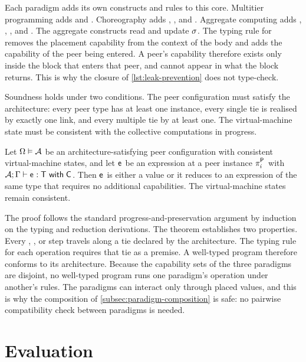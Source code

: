 Each paradigm adds its own constructs and rules to this core.
Multitier programming adds  and .
Choreography adds , , and .
Aggregate computing adds , , , and .
%
The aggregate constructs read and update $\vmstate$.
%
The typing rule for  removes the placement capability from the context of the body and adds the capability of the peer being entered.
%
A peer's capability therefore exists only inside the block that enters that peer,
and cannot appear in what the block returns.
%
This is why the closure of \cref{lst:leak-prevention} does not type-check.

Soundness holds under two conditions.
%
The peer configuration must satisfy the architecture:
every peer type has at least one instance, every single tie is realised by exactly one link, and every multiple tie by at least one.
%
The virtual-machine state must be consistent with the collective computations in progress.

\begin{theorem}[Soundness]
    \label{thm:camil-soundness}
    Let $\peerconf \vDash \arch$ be an architecture-satisfying peer configuration with consistent virtual-machine states,
    and let $\mpexpr$ be an expression at a peer instance $\peerinst[i]{\pfam}$ with $\typing{\Gamma}{\mpexpr}{\mptype}{\capset}$.
    Then $\mpexpr$ is either a value or it reduces to an expression of the same type that requires no additional capabilities.
    The virtual-machine states remain consistent.
\end{theorem}

The proof follows the standard progress-and-preservation argument by induction on the typing and reduction derivations.
%
The theorem establishes two properties.
%
Every , , or  step travels along a tie declared by the architecture.
The typing rule for each operation requires that tie as a premise.
A well-typed program therefore conforms to its architecture.
%
Because the capability sets of the three paradigms are disjoint,
no well-typed program runs one paradigm's operation under another's rules.
%
The paradigms can interact only through placed values,
and this is why the composition of \cref{subsec:paradigm-composition} is safe:
no pairwise compatibility check between paradigms is needed.

\section{Evaluation}
\label{sec:camil-evaluation}

